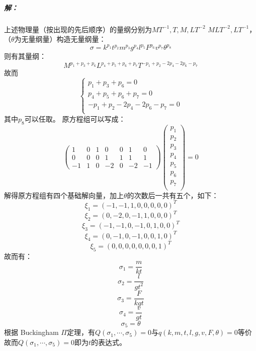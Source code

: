 \documentclass[UTF8]{ctexart}
\begin{document}
\subparagraph*{解：}
上述物理量（按出现的先后顺序）的量纲分别为$MT^{-1},T,M,LT^{-2}$ $MLT^{-2},LT^{-1}$，
（$\theta$为无量纲量）构造无量纲量：
$$
\sigma = k^{p_1}t^{p_2}m^{p_3}g^{p_4}l^{p_5}F^{p_6}v^{p_7}\theta^{p_8}
$$
则有其量纲：
$$
M^{p_1+p_3+p_6}L^{p_4+p_5+p_6+p_7}T^{-p_1+p_2-2p_4-2p_6-p_7}
$$
故而
$$
\begin{cases}
    p_1+p_3+p_6=0\\
    p_4+p_5+p_6+p_7=0\\
    -p_1+p_2-2p_4-2p_6-p_7=0\\
\end{cases}
$$
其中$p_8$可以任取。
原方程组可以写成：
$$
\begin{pmatrix}
    1&0&1&0&0&1&0\\
    0&0&0&1&1&1&1\\
    -1&1&0&-2&0&-2&-1
\end{pmatrix}
\begin{pmatrix}
    p_1\\
    p_2\\
    p_3\\
    p_4\\
    p_5\\
    p_6\\
    p_7\\
\end{pmatrix}
=0
$$
解得原方程组有四个基础解向量，加上$\theta$的次数后一共有五个，如下：
$$
\xi_1 = (-1,-1,1,0,0,0,0,0)^T
$$
$$
\xi_2 = (0,-2,0,-1,1,0,0,0)^T
$$
$$\xi_3 = (-1,-1,0,-1,0,1,0,0)^T$$
$$\xi_4 = (0,-1,0,-1,0,0,1,0)^T$$
$$\xi_5 = (0,0,0,0,0,0,0,1)^T$$
故而有：
$$\sigma_1 =\frac{m}{kt}$$
$$\sigma_2 = \frac{l}{gt^2}$$
$$\sigma_3 =\frac{F}{kgt}$$
$$\sigma_4 = \frac{v}{gt}$$
$$\sigma_5 = \theta$$
根据 Buckingham $\Pi $定理，有$Q(\sigma_1,\cdots,\sigma_5)=0$与$q(k,m,t,l,g,v,F,\theta)=0$等价
故而$Q(\sigma_1,\cdots,\sigma_5)=0$即为$t$的表达式。
\end{document}
